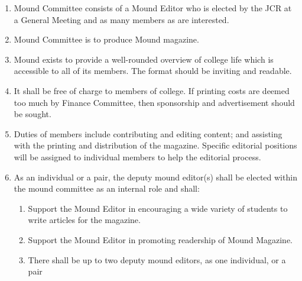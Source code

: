 \begin{enumerate}
    \item Mound Committee consists of a Mound Editor who is elected by the JCR at a General Meeting and as many members as are interested.
    \item Mound Committee is to produce Mound magazine.
    \item Mound exists to provide a well-rounded overview of college life which is accessible to all of its members. The format should be inviting and readable.
    \item It shall be free of charge to members of college. If printing costs are deemed too much by Finance Committee, then sponsorship and advertisement should be sought.
    \item Duties of members include contributing and editing content; and assisting with the printing and distribution of the magazine. Specific editorial positions will be assigned to individual members to help the editorial process.
    \item As an individual or a pair, the deputy mound editor(s) shall be elected within the mound committee as an internal role and shall:
    \begin{enumerate}
        \item Support the Mound Editor in encouraging a wide variety of students to write articles for the magazine.
        \item Support the Mound Editor in promoting readership of Mound Magazine. 
        \item There shall be up to two deputy mound editors, as one individual, or a pair
    \end{enumerate}
\end{enumerate}



